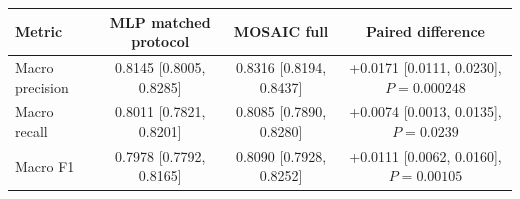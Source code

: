 \begin{tabular}{lccc}
\toprule
Metric & MLP matched protocol & MOSAIC full & Paired difference \\
\midrule
Macro precision & 0.8145 [0.8005, 0.8285] & 0.8316 [0.8194, 0.8437] & +0.0171 [0.0111, 0.0230], $P=0.000248$ \\
Macro recall & 0.8011 [0.7821, 0.8201] & 0.8085 [0.7890, 0.8280] & +0.0074 [0.0013, 0.0135], $P=0.0239$ \\
Macro F1 & 0.7978 [0.7792, 0.8165] & 0.8090 [0.7928, 0.8252] & +0.0111 [0.0062, 0.0160], $P=0.00105$ \\
\bottomrule
\end{tabular}
